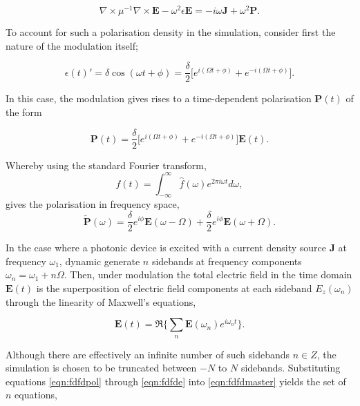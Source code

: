 \begin{equation}
\nabla \times \mu^{-1} \nabla \times \bm{E} - \omega^2 \epsilon \bm{E} = -i \omega \bm{J} + \omega^2 \bm{P}.
\end{equation}

To account for such a polarisation density in the simulation, consider first the nature of the modulation itself;

\begin{equation}
\epsilon(t)' = \delta \cos(\omega t + \phi) =  \dfrac{\delta}{2} \big[e^{i(\Omega t + \phi)} + e^{-i(\Omega t + \phi)}\big].
\end{equation}

In this case, the modulation gives rises to a time-dependent polarisation $\bm{P}(t)$ of the form

\begin{equation}
{\bm{P}}(t) = \dfrac{\delta}{2} \big[e^{i(\Omega t + \phi)} + e^{-i(\Omega t + \phi)}\big]\bm{E}(t).
\end{equation}

Whereby using the standard Fourier transform,
\begin{equation}
f(t) = \int_{-\infty}^{\infty} \hat{f}(\omega) e^{2 \pi i \omega t} d \omega,
\end{equation}
gives the polarisation in frequency space,
\begin{equation}
\tilde{\bm{P}}(\omega) = \dfrac{\delta}{2} e^{i \phi} \bm{E}(\omega-\Omega) + \dfrac{\delta}{2} e^{i \phi} \bm{E}(\omega+ \Omega).
\label{eqn:fdfdpol}
\end{equation}

In the case where a photonic device is excited with a current density source $\bm{J}$ at frequency $\omega_1$, dynamic generate $n$ sidebands at frequency components $\omega_n = \omega_1 + n \Omega$. Then, under modulation the total electric field in the time domain $\bm{E}(t)$ is the superposition of electric field components at each sideband $E_z(\omega_n)$ through the linearity of Maxwell's equations,

\begin{equation}
{\bm{E}}(t) = \Re \{\sum_n \bm{E}(\omega_n)e^{i \omega_n t}\}.	
\label{eqn:fdfde}
\end{equation}

Although there are effectively an infinite number of such sidebands $n \in Z$, the simulation is chosen to be truncated between $-N$ to $N$ sidebands. Substituting equations \ref{eqn:fdfdpol} through \ref{eqn:fdfde} into \ref{eqn:fdfdmaster} yields the set of $n$ equations,

